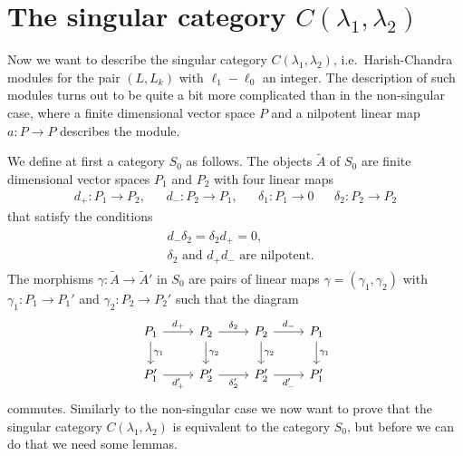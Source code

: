 \section{\texorpdfstring{The singular category $C(\lambda_1,\lambda_2)$}{The singular category C(lambda\_1,lambda\_2)}}

Now we want to describe the singular category $C(\lambda_1,\lambda_2)$, i.e.\ Harish-Chandra modules for the pair $(L,L_k)$ with $\ell_1-\ell_0$ an integer. The description of such modules turns out to be quite a bit more complicated than in the non-singular case, where a finite dimensional vector space $P$ and a nilpotent linear map $a\colon P\to P$ describes the module.

We define at first a category $S_0$ as follows. The objects $\widetilde{A}$ of $S_0$ are finite dimensional vector spaces $P_1$ and $P_2$ with four linear maps
\begin{align}
  d_+ \colon P_1\to P_2, && d_- \colon P_2\to P_1, && \delta_1\colon P_1\to 0 && \delta_2\colon P_2\to P_2
\end{align}
that satisfy the conditions
\begin{align}
  \begin{aligned}
    &d_-\delta_2 = \delta_2d_+ = 0, \\
    &\delta_2 \text{ and } d_+d_- \text{ are nilpotent.}
  \end{aligned}
\end{align}
The morphisms $\gamma\colon \widetilde{A}\to \widetilde{A}'$ in $S_0$ are pairs of linear maps $\gamma=(\gamma_1,\gamma_2)$ with $\gamma_1\colon P_1\to P_1'$ and $\gamma_2\colon P_2\to P_2'$ such that the diagram
\begin{equation}\label{eq:S0diagram}
  \begin{tikzcd}
    P_1 \ar[d,"\gamma_1"] \ar[r,"d_+"] & P_2 \ar[d,"\gamma_2"] \ar[r,"\delta_2"] & P_2 \ar[d,"\gamma_2"] \ar[r,"d_-"] & P_1 \ar[d,"\gamma_1"] \\
    P_1' \ar[r,"d_+'",swap] & P_2' \ar[r,"\delta_2'",swap] & P_2' \ar[r,"d_-'",swap] & P_1'
  \end{tikzcd}
\end{equation}
commutes. Similarly to the non-singular case we now want to prove that the singular category $C(\lambda_1,\lambda_2)$ is equivalent to the category $S_0$, but before we can do that we need some lemmas.

